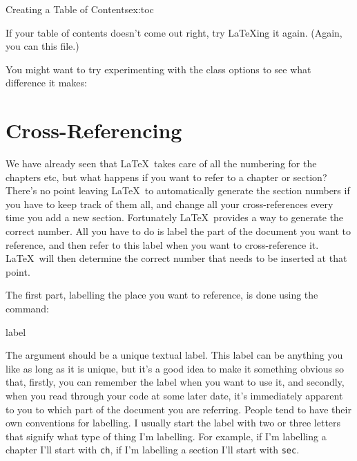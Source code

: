 \begin{exercise}{Creating a Table of Contents}{ex:toc}
\begin{bcode}
\begin{alltt}
\end{alltt}
\end{bcode}

If your table of contents doesn't come out right, try \LaTeX{}ing it
again.  (Again, you can  this file.)

You might want to try experimenting with the
 class options to
see what difference it makes:
\begin{codeS}
\end{codeS}

\end{exercise}


\section{Cross-Referencing}
\label{sec:crossref}

We have already seen that \LaTeX\ takes care of all the numbering for
the chapters etc, but what happens if you want to refer to a chapter
or section?  There's no point leaving \LaTeX\ to automatically
generate the section numbers if you have to keep track of them all,
and change all your cross-references every time you add a new
section.  Fortunately \LaTeX\ provides a way to generate the correct
number. All you have to do is label the part of the document you want
to reference, and then refer to this label when you want to
cross-reference it.  \LaTeX\ will then determine the correct number
that needs to be inserted at that point.

The first part, labelling the place you want to reference, is done 
using the command:
\begin{definition}
\gls{label}
\end{definition}\label{obj:label}%
The \gls{argument}  should be a
unique textual label.  This label can be anything you like as long as
it is unique, but it's a good idea to make it something obvious
so that, firstly, you can remember the label when you want to 
use it, and secondly, when you read through your code at some later
date, it's immediately apparent to you to which part of the
document you are referring.  People tend to have their own conventions
for labelling.  I usually start the label with two or three letters
that signify what type of thing I'm labelling.  For example, if I'm
labelling a chapter I'll start with \texttt{ch}, if I'm labelling a
section I'll start with \texttt{sec}. 

